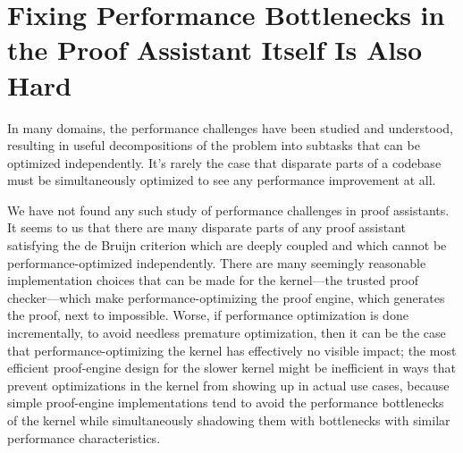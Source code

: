 \section{Fixing Performance Bottlenecks in the Proof Assistant Itself Is Also Hard}

In many domains, the performance challenges have been studied and understood, resulting in useful decompositions of the problem into subtasks that can be optimized independently.
It's rarely the case that disparate parts of a codebase must be simultaneously optimized to see any performance improvement at all.

We have not found any such study of performance challenges in proof assistants.
It seems to us that there are many disparate parts of any proof assistant satisfying the de Bruijn criterion which are deeply coupled and which cannot be performance-optimized independently.
There are many seemingly reasonable implementation choices that can be made for the kernel---the trusted proof checker---which make performance-optimizing the proof engine, which generates the proof, next to impossible.
Worse, if performance optimization is done incrementally, to avoid needless premature optimization, then it can be the case that performance-optimizing the kernel has effectively no visible impact; the most efficient proof-engine design for the slower kernel might be inefficient in ways that prevent optimizations in the kernel from showing up in actual use cases, because simple proof-engine implementations tend to avoid the performance bottlenecks of the kernel while simultaneously shadowing them with bottlenecks with similar performance characteristics.

\begin{comment}
\todo{Find a place for this (h/t conversation with Andres)}:  because we have a kernel and a proof engine on top of it, you need to simultaneously optimize the kernel and the proof engine to see performance improvements; if the kernel API doesn't give you good enough performance on primitives, then there's no hope to optimizing the proof engine, but at the same time if the proof engine is not optimized right, improvements in the performance of the kernel API don't have noticeable impact.

\todo{incorporate Andres' suggestions}
I like the last two sentences.
I would instead lead with something along the lines of ``in many domains, the performance challenges have been studied and understood, resulting in useful decompositions of the problem into subtasks that can be optimized independently.''
``in proof assistants, it doesn't look like anyone has even tried'' :P.
but e g signal processing was a huge mess too before the fast Fourier transform.
coq abstractions are mostly accidents of history.
no other system has a clear performance-conscious story for how these interfaces should be designed either.
\end{comment}




